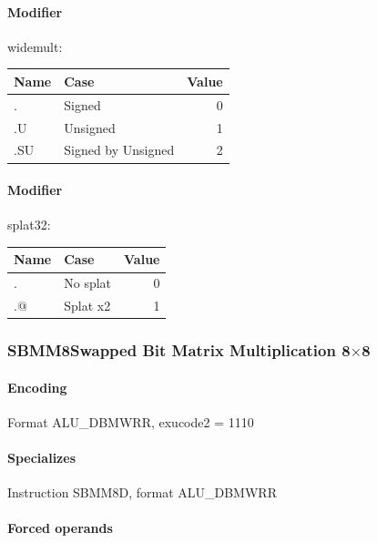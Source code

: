 {\paragraph{Modifier} \textsf{widemult}:\\

\noindent \begin{tabular}{|l|l|r|} \hline
\bf{Name} & \bf{Case} & \bf{Value} \\ \hline
. & Signed & 0 \\
.U & Unsigned & 1 \\
.SU & Signed by Unsigned & 2 \\
\hline \end{tabular}

\paragraph{Modifier} \textsf{splat32}:\\

\noindent \begin{tabular}{|l|l|r|} \hline
\bf{Name} & \bf{Case} & \bf{Value} \\ \hline
. & No splat & 0 \\
.@ & Splat x2 & 1 \\
\hline \end{tabular}
\newpage
\subsubsection[{\small SBMM8: Swapped Bit Matrix Multiplication 8$\times$8}]{SBMM8\hfill Swapped Bit Matrix Multiplication 8$\times$8}
\label{instr:SBMM8}

\paragraph{Encoding} Format \textsf{ALU\_DBMWRR, exucode2 = 1110}\\



\paragraph{Specializes} Instruction SBMM8D, format ALU\_DBMWRR

\paragraph{Forced operands} 

}
